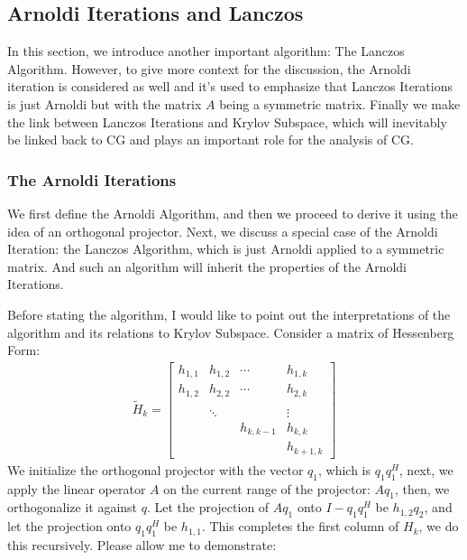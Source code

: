 \documentclass[]{article}
\theoremstyle{definition}
\begin{document}
    \subsection{Arnoldi Iterations and Lanczos}
        In this section, we introduce another important algorithm: The Lanczos Algorithm. However, to give more context for the discussion, the Arnoldi iteration is considered as well and it's used to emphasize that Lanczos Iterations is just Arnoldi but with the matrix $A$ being a symmetric matrix. Finally we make the link between Lanczos Iterations and Krylov Subspace, which will inevitably be linked back to CG and plays an important role for the analysis of CG. 
        \subsubsection{The Arnoldi Iterations}
            We first define the Arnoldi Algorithm, and then we proceed to derive it using the idea of an orthogonal projector. Next, we discuss a special case of the Arnoldi Iteration: the Lanczos Algorithm, which is just Arnoldi applied to a symmetric matrix. And such an algorithm will inherit the properties of the Arnoldi Iterations. 
            \par
            Before stating the algorithm, I would like to point out the interpretations of the algorithm and its relations to Krylov Subspace. Consider a matrix of Hessenberg Form:
            \begin{align}
                \tilde{H}_k = 
                \begin{bmatrix}
                    h_{1, 1} & h_{1, 2} & \cdots & h_{1, k} 
                    \\
                    h_{1, 2} & h_{2, 2} & \cdots & h_{2, k}
                    \\
                    \\
                    & \ddots & &\vdots
                    \\
                    & & h_{k, k - 1}& h_{k, k}
                    \\
                    & & & h_{k + 1, k}
                \end{bmatrix}
            \end{align}
            We initialize the orthogonal projector with the vector $q_1$, which is $q_1q_1^H$, next, we apply the linear operator $A$ on the current range of the projector: $Aq_1$, then, we orthogonalize it against $q$. Let the projection of $Aq_1$ onto $I - q_1q_1^H$ be $h_{1, 2}q_2$, and let the projection onto $q_1q_1^H$ be $h_{1,1}$. This completes the first column of $H_k$, we do this recursively. Please allow me to demonstrate: 
\end{document}
